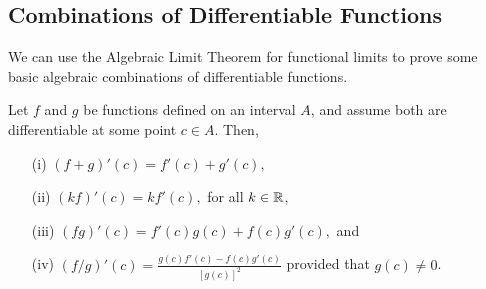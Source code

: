 \subsection{Combinations of Differentiable Functions}

We can use the Algebraic Limit Theorem for functional limits to prove some basic algebraic combinations of differentiable functions.

\begin{theorem}
    Let \( f  \) and \( g  \) be functions defined on an interval \( A  \), and assume both are differentiable at some point \( c \in A \). Then, 
    \begin{enumerate}
        \item[(i)] \( (f+g)'(c) = f'(c) + g'(c), \)
        \item[(ii)] \( (kf)'(c) = kf'(c), \) for all \( k \in \mathbb{R}  \),
        \item[(iii)] \( (fg)'(c) = f'(c)g(c) + f(c)g'(c),  \) and 
        \item[(iv)] \( (f/g)'(c) = \frac{ g(c)f'(c) - f(c)g'(c)  }{ [g(c)]^2 }  \) provided that \( g(c) \neq  0 \).
    \end{enumerate}
    \end{theorem}

